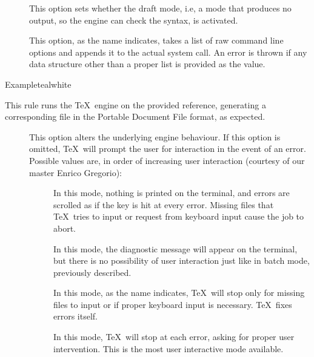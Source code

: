 \begin{description}
\begin{description}
\item[] This option sets whether the draft mode, i.e, a mode that produces no output, so the engine can check the syntax, is activated.

\item[] This option, as the name indicates, takes a list of raw command line options and appends it to the actual system call. An error is thrown if any data structure other than a proper list is provided as the value.
\end{description}

\begin{codebox}{Example}{teal}{\icnote}{white}
\end{codebox}

\item[\rulebox{pdftex}{Marco Daniel, Paulo Cereda}] This rule runs the  \TeX\ engine on the provided  reference, generating a corresponding file in the Portable Document File format, as expected.

\begin{description}
\item[] This option alters the underlying engine behaviour. If this option is omitted, \TeX\ will prompt the user for interaction in the event of an error. Possible values are, in order of increasing user interaction (courtesy of our master Enrico Gregorio):

\begin{description}
\item[] In this mode, nothing is printed on the terminal, and errors are scrolled as if the  key is hit at every error. Missing files that \TeX\ tries to input or request from keyboard input cause the job to abort.

\item[] In this mode, the diagnostic message will appear on the terminal, but there is no possibility of user interaction just like in batch mode, previously described.

\item[] In this mode, as the name indicates, \TeX\ will stop only for missing files to input or if proper keyboard input is necessary. \TeX\ fixes errors itself.

\item[] In this mode, \TeX\ will stop at each error, asking for proper user intervention. This is the most user interactive mode available.
\end{description}


\end{description}
\end{description}
